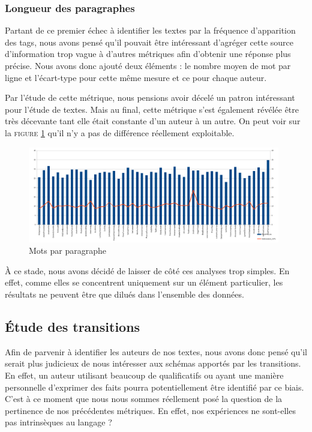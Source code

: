 \documentclass[a4paper]{article}
\begin{document}


\subsubsection{Longueur des paragraphes}

Partant de ce premier échec à identifier les textes par la fréquence d'apparition des tags, nous avons pensé qu'il pouvait être intéressant d’agréger cette source d'information trop vague à d'autres métriques afin d'obtenir une réponse plus précise. Nous avons donc ajouté deux éléments : le nombre moyen de mot par ligne et l'écart-type pour cette même mesure et ce pour chaque auteur.

Par l'étude de cette métrique, nous pensions avoir décelé un patron intéressant pour l'étude de textes. Mais au final, cette métrique s'est également révélée être très décevante tant elle était constante d'un auteur à un autre. On peut voir sur la \textsc{figure \ref{WPL}} qu'il n'y a pas de différence réellement exploitable.
				
\begin{figure}[hbtp]
\centering
\includegraphics[width=11cm]{fig/WPL.png}
\caption{Mots par paragraphe}
\label{WPL}
\end{figure}

À ce stade, nous avons décidé de laisser de côté ces analyses trop simples. En effet, comme elles se concentrent uniquement sur un élément particulier, les résultats ne peuvent être que dilués dans l'ensemble des données.


\subsection{Étude des transitions}

Afin de parvenir à identifier les auteurs de nos textes, nous avons donc pensé qu'il serait plus judicieux de nous intéresser aux schémas apportés par les transitions. En effet, un auteur utilisant beaucoup de qualificatifs ou ayant une manière personnelle d'exprimer des faits pourra potentiellement être identifié par ce biais. C'est à ce moment que nous nous sommes réellement posé la question de la pertinence de nos précédentes métriques. En effet, nos expériences ne sont-elles pas intrinsèques au langage ?
\end{document}
